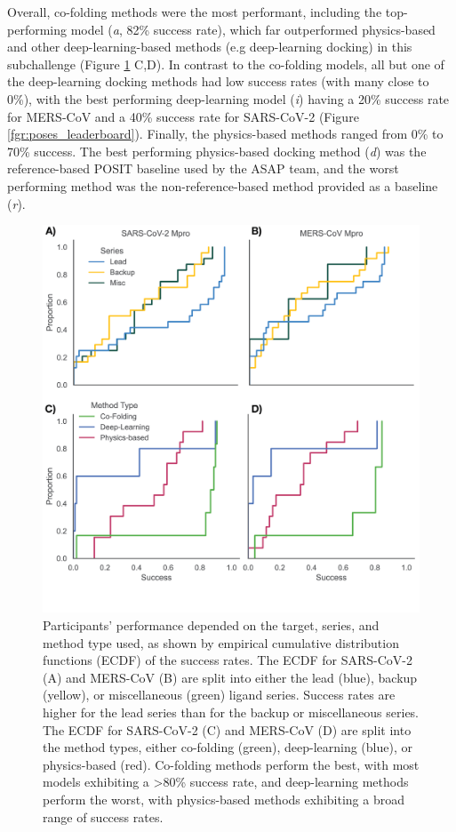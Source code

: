 \documentclass[journal=jcim,manuscript=article]{achemso}
\begin{document}
Overall, co-folding methods were the most performant, including the top-performing model (\textit{a}, 82\% success rate), which far outperformed physics-based and other deep-learning-based methods (e.g deep-learning docking) in this subchallenge (Figure \ref{fgr:poses_by_series_and_method} C,D). 
In contrast to the co-folding models, all but one of the deep-learning docking methods had low success rates (with many close to 0\%), with the best performing deep-learning model (\textit{i}) having a 20\% success rate for MERS-CoV and a 40\% success rate for SARS-CoV-2 (Figure \ref{fgr:poses_leaderboard}). Finally, the physics-based methods ranged from 0\% to 70\% success. The best performing physics-based docking method (\textit{d}) was the reference-based POSIT baseline used by the ASAP team, and the worst performing method was the non-reference-based method provided as a baseline (\textit{r}).


\begin{figure}
    \includegraphics[scale=1
    ]{04_figs_leaderboards/poses_by_series_and_method.png}
  \caption{Participants' performance depended on the target, series, and method type used, as shown by empirical cumulative distribution functions (ECDF) of the success rates. The ECDF for SARS-CoV-2 (A) and MERS-CoV (B) are  split into either the lead (blue), backup (yellow), or miscellaneous (green) ligand series. Success rates are higher for the lead series than for the backup or miscellaneous series. The ECDF for SARS-CoV-2 (C) and MERS-CoV (D) are  split into the method types, either co-folding (green), deep-learning (blue), or physics-based (red). Co-folding methods perform the best, with most models exhibiting a \textgreater 80\% success rate, and deep-learning methods perform the worst, with physics-based methods exhibiting a broad range of success rates.}
  \label{fgr:poses_by_series_and_method}
\end{figure}
\end{document}
